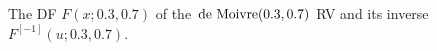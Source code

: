 \begin{figure}[htpb]
\caption{The DF $F(x;0.3,0.7)$ of the $\mbox{{\rm de~Moivre}}(0.3,0.7)$ RV and its inverse $F^{[-1]}(u;0.3,0.7)$. \label{F:InvSamk2}}
\centering   {}
\end{figure}

